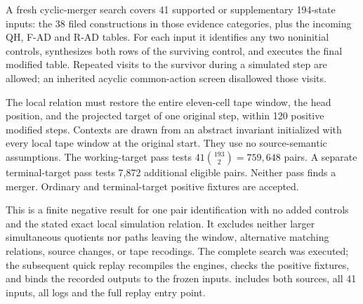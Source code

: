 A fresh cyclic-merger search covers 41 supported or supplementary
194-state inputs: the 38 filed constructions in those evidence categories,
plus the incoming QH, F-AD and R-AD tables. For each input it identifies
any two noninitial controls, synthesizes both rows of the surviving control,
and executes the final modified table. Repeated visits to the survivor
during a simulated step are allowed; an inherited acyclic common-action
screen disallowed those visits.

The local relation must restore the entire eleven-cell tape window,
the head position, and the projected target of one original step, within
120 positive modified steps. Contexts are drawn from an abstract invariant
initialized with every local tape window at the original start. They use
no source-semantic assumptions. The working-target pass tests
$41\binom{193}{2}=759{,}648$ pairs. A separate terminal-target pass tests
7,872 additional eligible pairs. Neither pass finds a merger.
Ordinary and terminal-target positive fixtures are accepted.

This is a finite negative result for one pair identification with no added
controls and the stated exact local simulation relation. It excludes neither
larger simultaneous quotients nor paths leaving the window, alternative
matching relations, source changes, or tape recodings. The complete search
was executed; the subsequent quick replay recompiles the engines, checks
the positive fixtures, and binds the recorded outputs to the frozen inputs.
 includes both sources, all 41 inputs, all
logs and the full replay entry point.
